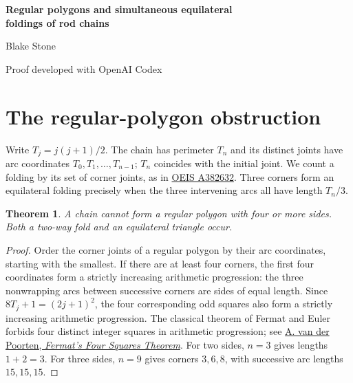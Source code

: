 \documentclass[11pt,letterpaper]{article}
\newtheorem{theorem}{Theorem}
\begin{document}
\begin{center}
{\LARGE\bfseries Regular polygons and simultaneous equilateral\\[2pt] foldings of rod chains}\par\vspace{8pt}
Blake Stone\par{\small Proof developed with OpenAI Codex}
\end{center}
\begin{abstract}
A cyclic chain uses rods of lengths $1,2,\ldots,n$ in that order, with bends permitted at their joints. We prove the regular-polygon conjecture in OEIS A382632 by reducing it to the classical four-squares theorem. We then give an explicit infinite family in which each chain admits at least three different sets of corners for an equilateral triangle.
\end{abstract}

\section*{The regular-polygon obstruction}
Write $T_j=j(j+1)/2$. The chain has perimeter $T_n$ and its distinct joints have arc coordinates $T_0,T_1,\ldots,T_{n-1}$; $T_n$ coincides with the initial joint. We count a folding by its set of corner joints, as in \href{https://oeis.org/A382632}{OEIS A382632}. Three corners form an equilateral folding precisely when the three intervening arcs all have length $T_n/3$.

\begin{theorem}
A chain cannot form a regular polygon with four or more sides. Both a two-way fold and an equilateral triangle occur.
\end{theorem}
\begin{proof}
Order the corner joints of a regular polygon by their arc coordinates, starting with the smallest. If there are at least four corners, the first four coordinates form a strictly increasing arithmetic progression: the three nonwrapping arcs between successive corners are sides of equal length. Since $8T_j+1=(2j+1)^2$, the four corresponding odd squares also form a strictly increasing arithmetic progression. The classical theorem of Fermat and Euler forbids four distinct integer squares in arithmetic progression; see \href{https://arxiv.org/abs/0712.3850}{A. van der Poorten, \emph{Fermat's Four Squares Theorem}}. For two sides, $n=3$ gives lengths $1+2=3$. For three sides, $n=9$ gives corners $3,6,8$, with successive arc lengths $15,15,15$.
\end{proof}
\end{document}
